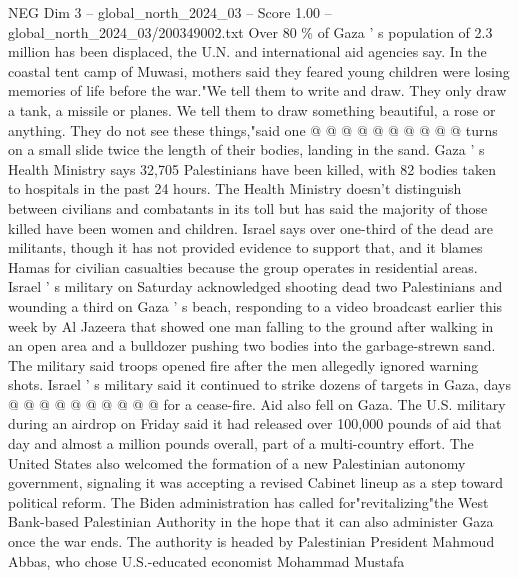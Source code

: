 \begin{textsample}{NEG Dim 3 – global\_north\_2024\_03 – Score 1.00 – global\_north\_2024\_03/200349002.txt}
Over 80 \% of Gaza ' s population of 2.3 million has been displaced, the U.N. and international aid agencies say.
In the coastal tent camp of Muwasi, mothers said they feared young children were losing memories of life before the war."We tell them to write and draw.
They only draw a tank, a missile or planes.
We tell them to draw something beautiful, a rose or anything.
They do not see these things,"said one @ @ @ @ @ @ @ @ @ @ turns on a small slide twice the length of their bodies, landing in the sand.
Gaza ' s Health Ministry says 32,705 Palestinians have been killed, with 82 bodies taken to hospitals in the past 24 hours.
The Health Ministry doesn't distinguish between civilians and combatants in its toll but has said the majority of those killed have been women and children.
Israel says over one-third of the dead are militants, though it has not provided evidence to support that, and it blames Hamas for civilian casualties because the group operates in residential areas.
Israel ' s military on Saturday acknowledged shooting dead two Palestinians and wounding a third on Gaza ' s beach, responding to a video broadcast earlier this week by Al Jazeera that showed one man falling to the ground after walking in an open area and a bulldozer pushing two bodies into the garbage-strewn sand.
The military said troops opened fire after the men allegedly ignored warning shots.
Israel ' s military said it continued to strike dozens of targets in Gaza, days @ @ @ @ @ @ @ @ @ @ for a cease-fire.
Aid also fell on Gaza.
The U.S. military during an airdrop on Friday said it had released over 100,000 pounds of aid that day and almost a million pounds overall, part of a multi-country effort.
The United States also welcomed the formation of a new Palestinian autonomy government, signaling it was accepting a revised Cabinet lineup as a step toward political reform.
The Biden administration has called for"revitalizing"the West Bank-based Palestinian Authority in the hope that it can also administer Gaza once the war ends.
The authority is headed by Palestinian President Mahmoud Abbas, who chose U.S.-educated economist Mohammad Mustafa

\end{textsample}
